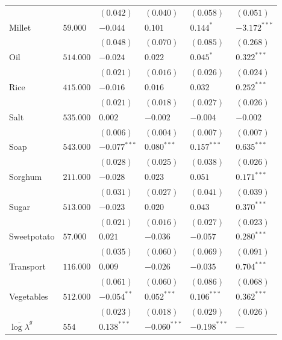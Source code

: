 \documentclass[11pt]{article}
\begin{document}
\begin{table}[htb]
\begin{tabular}{llllll}
 &  & $(0.042)$ & $(0.040)$ & $(0.058)$ & $(0.051)$\\
Millet & $59.000$ & $-0.044$ & $0.101$ & $0.144^{*}$ & $-3.172^{***}$\\
 &  & $(0.048)$ & $(0.070)$ & $(0.085)$ & $(0.268)$\\
Oil & $514.000$ & $-0.024$ & $0.022$ & $0.045^{*}$ & $0.322^{***}$\\
 &  & $(0.021)$ & $(0.016)$ & $(0.026)$ & $(0.024)$\\
Rice & $415.000$ & $-0.016$ & $0.016$ & $0.032$ & $0.252^{***}$\\
 &  & $(0.021)$ & $(0.018)$ & $(0.027)$ & $(0.026)$\\
Salt & $535.000$ & $0.002$ & $-0.002$ & $-0.004$ & $-0.002$\\
 &  & $(0.006)$ & $(0.004)$ & $(0.007)$ & $(0.007)$\\
Soap & $543.000$ & $-0.077^{***}$ & $0.080^{***}$ & $0.157^{***}$ & $0.635^{***}$\\
 &  & $(0.028)$ & $(0.025)$ & $(0.038)$ & $(0.026)$\\
Sorghum & $211.000$ & $-0.028$ & $0.023$ & $0.051$ & $0.171^{***}$\\
 &  & $(0.031)$ & $(0.027)$ & $(0.041)$ & $(0.039)$\\
Sugar & $513.000$ & $-0.023$ & $0.020$ & $0.043$ & $0.370^{***}$\\
 &  & $(0.021)$ & $(0.016)$ & $(0.027)$ & $(0.023)$\\
Sweetpotato & $57.000$ & $0.021$ & $-0.036$ & $-0.057$ & $0.280^{***}$\\
 &  & $(0.035)$ & $(0.060)$ & $(0.069)$ & $(0.091)$\\
Transport & $116.000$ & $0.009$ & $-0.026$ & $-0.035$ & $0.704^{***}$\\
 &  & $(0.061)$ & $(0.060)$ & $(0.086)$ & $(0.068)$\\
Vegetables & $512.000$ & $-0.054^{**}$ & $0.052^{***}$ & $0.106^{***}$ & $0.362^{***}$\\
 &  & $(0.023)$ & $(0.018)$ & $(0.029)$ & $(0.026)$\\
\hline
$\overline{\log\lambda}^g$ & $554$ & $0.138^{***}$ & $-0.060^{***}$ & $-0.198^{***}$ & ---\\
\end{tabular}
\end{table}
\end{document}
